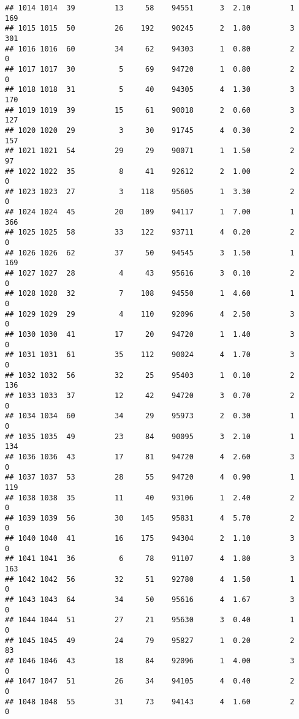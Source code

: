 \documentclass[
]{article}
\begin{document}
\begin{verbatim}
## 1014 1014  39         13     58    94551      3  2.10         1      169
## 1015 1015  50         26    192    90245      2  1.80         3      301
## 1016 1016  60         34     62    94303      1  0.80         2        0
## 1017 1017  30          5     69    94720      1  0.80         2        0
## 1018 1018  31          5     40    94305      4  1.30         3      170
## 1019 1019  39         15     61    90018      2  0.60         3      127
## 1020 1020  29          3     30    91745      4  0.30         2      157
## 1021 1021  54         29     29    90071      1  1.50         2       97
## 1022 1022  35          8     41    92612      2  1.00         2        0
## 1023 1023  27          3    118    95605      1  3.30         2        0
## 1024 1024  45         20    109    94117      1  7.00         1      366
## 1025 1025  58         33    122    93711      4  0.20         2        0
## 1026 1026  62         37     50    94545      3  1.50         1      169
## 1027 1027  28          4     43    95616      3  0.10         2        0
## 1028 1028  32          7    108    94550      1  4.60         1        0
## 1029 1029  29          4    110    92096      4  2.50         3        0
## 1030 1030  41         17     20    94720      1  1.40         3        0
## 1031 1031  61         35    112    90024      4  1.70         3        0
## 1032 1032  56         32     25    95403      1  0.10         2      136
## 1033 1033  37         12     42    94720      3  0.70         2        0
## 1034 1034  60         34     29    95973      2  0.30         1        0
## 1035 1035  49         23     84    90095      3  2.10         1      134
## 1036 1036  43         17     81    94720      4  2.60         3        0
## 1037 1037  53         28     55    94720      4  0.90         1      119
## 1038 1038  35         11     40    93106      1  2.40         2        0
## 1039 1039  56         30    145    95831      4  5.70         2        0
## 1040 1040  41         16    175    94304      2  1.10         3        0
## 1041 1041  36          6     78    91107      4  1.80         3      163
## 1042 1042  56         32     51    92780      4  1.50         1        0
## 1043 1043  64         34     50    95616      4  1.67         3        0
## 1044 1044  51         27     21    95630      3  0.40         1        0
## 1045 1045  49         24     79    95827      1  0.20         2       83
## 1046 1046  43         18     84    92096      1  4.00         3        0
## 1047 1047  51         26     34    94105      4  0.40         2        0
## 1048 1048  55         31     73    94143      4  1.60         2        0

\end{verbatim}
\end{document}
